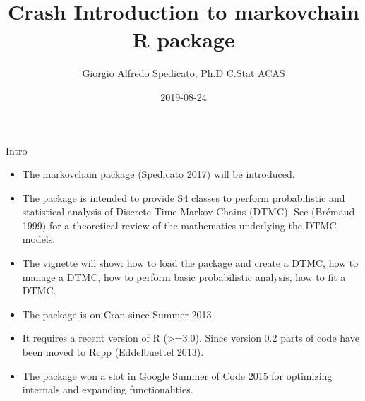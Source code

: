 \documentclass[ignorenonframetext,]{beamer}
\title{Crash Introduction to markovchain R package}
\author{Giorgio Alfredo Spedicato, Ph.D C.Stat ACAS}
\date{2019-08-24}
\providecommand{\tightlist}{%
  \setlength{\itemsep}{0pt}\setlength{\parskip}{0pt}}
\providecommand{\tightlist}{
  \setlength{\itemsep}{0pt}\setlength{\parskip}{0pt}
}
\begin{document}
\frame{\titlepage}

\begin{frame}
\tableofcontents[hideallsubsections]
\end{frame}
\begin{frame}

\end{frame}

\begin{frame}{Intro}
\protect\hypertarget{intro}{}

\begin{itemize}
\tightlist
\item
  The markovchain package (Spedicato 2017) will be introduced.
\item
  The package is intended to provide S4 classes to perform probabilistic
  and statistical analysis of Discrete Time Markov Chains (DTMC). See
  (Brémaud 1999) for a theoretical review of the mathematics underlying
  the DTMC models.
\item
  The vignette will show: how to load the package and create a DTMC, how
  to manage a DTMC, how to perform basic probabilistic analysis, how to
  fit a DTMC.
\end{itemize}

\end{frame}

\begin{frame}

\begin{itemize}
\tightlist
\item
  The package is on Cran since Summer 2013.
\item
  It requires a recent version of R (\textgreater{}=3.0). Since version
  0.2 parts of code have been moved to Rcpp (Eddelbuettel 2013).
\item
  The package won a slot in Google Summer of Code 2015 for optimizing
  internals and expanding functionalities.
\end{itemize}

\end{frame}
\end{document}
